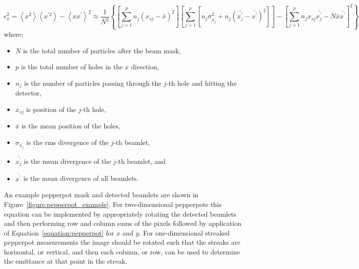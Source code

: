 \begin{dmath}\label{equation:pepperpot}
\epsilon_x^2 = \left\langle x^2\right\rangle \left\langle x^{\prime2}\right\rangle - \left\langle xx^\prime\right\rangle^2\allowbreak
\approx \frac{1}{N^2} \left\{\left[\sum_{j=1}^p{n_j\left(x_{sj}-\bar{x}\right)^2}\right] \left[ \sum_{j=1}^p{\left[n_j\sigma_{x_j^\prime}^2 + n_j\left(\bar{x_j^\prime}-\bar{x^\prime}\right)^2\right]}\right] - \left[ \sum_{j=1}^p{n_jx_{sj}\bar{x_j^\prime}-N\bar{x}\bar{x^\prime}}\right]^2\right\}
\end{dmath}
where;
\begin{itemize}
    \item $N$ is the total number of particles after the beam mask,
    \item $p$ is the total number of holes in the $x$ direction,
    \item $n_j$ is the number of particles passing through the $j$-th hole and hitting the detector,
    \item $x_{sj}$ is position of the $j$-th hole,
    \item $\bar{x}$ is the mean position of the holes,
    \item $\sigma_{x_j^\prime}$ is the \gls{rms} divergence of the $j$-th beamlet,
    \item $\bar{x_j^\prime}$ is the mean divergence of the $j$-th beamlet, and
    \item $\bar{x^\prime}$ is the mean divergence of all beamlets.
\end{itemize}

An example pepperpot mask and detected beamlets are shown in Figure~\ref{figure:pepperpot_example}.
For two-dimensional pepperpots this equation can be implemented by appropriately rotating the detected beamlets and then performing row and column sums of the pixels followed by application of Equation~\ref{equation:pepperpot} for $x$ and $y$.
For one-dimensional streaked pepperpot measurements the image should be rotated such that the streaks are horizontal, or vertical, and then each column, or row, can be used to determine the emittance at that point in the streak.

